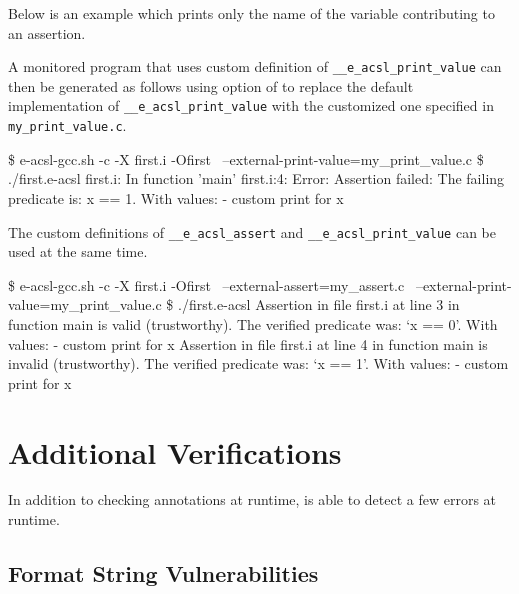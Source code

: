 Below is an example which prints only the name of the variable contributing to
an assertion.


A monitored program that uses custom definition of
\texttt{\_\_e\_acsl\_print\_value} can then be
generated as follows using  option of \eacslgcc to
replace the default implementation of \texttt{\_\_e\_acsl\_print\_value}
 with the customized one specified in
\texttt{my\_print\_value.c}.

\begin{shell}
\$ e-acsl-gcc.sh -c -X first.i -Ofirst \
    --external-print-value=my_print_value.c
\$ ./first.e-acsl
first.i: In function 'main'
first.i:4: Error: Assertion failed:
        The failing predicate is:
        x == 1.
        With values:
        - custom print for x
\end{shell}

The custom definitions of \texttt{\_\_e\_acsl\_assert}
and \texttt{\_\_e\_acsl\_print\_value}\codeidxdef{e\_acsl\_print\_value} can be
used at the same time.

\begin{shell}
\$ e-acsl-gcc.sh -c -X first.i -Ofirst \
    --external-assert=my_assert.c \
    --external-print-value=my_print_value.c
\$ ./first.e-acsl
Assertion in file first.i at line 3 in function main is valid (trustworthy).
The verified predicate was: `x == 0'.
With values:
        - custom print for x
Assertion in file first.i at line 4 in function main is invalid (trustworthy).
The verified predicate was: `x == 1'.
With values:
        - custom print for x
\end{shell}

\section{Additional Verifications} %

In addition to checking annotations at runtime, \eacsl is able to detect a few
errors at runtime.

\subsection{Format String Vulnerabilities}

